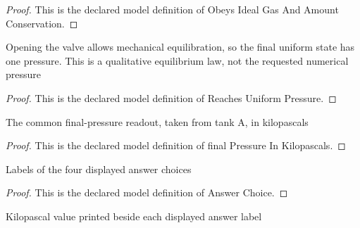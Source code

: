 \begin{proof}
  This is the declared model definition of Obeys Ideal Gas And Amount Conservation.
\end{proof}
\begin{definition}
  \label{def:physics:phyx-mini-0400:phyxminiproblems-problemphyxmini0400-reachesuniformpressure}
  Opening the valve allows mechanical equilibration, so the final uniform state has one pressure. This is a qualitative equilibrium law, not the requested numerical pressure
\end{definition}
\begin{proof}
  This is the declared model definition of Reaches Uniform Pressure.
\end{proof}
\begin{definition}
  \label{def:physics:phyx-mini-0400:phyxminiproblems-problemphyxmini0400-finalpressureinkilopascals}
  The common final-pressure readout, taken from tank A, in kilopascals
\end{definition}
\begin{proof}
  This is the declared model definition of final Pressure In Kilopascals.
\end{proof}
\begin{definition}
  \label{def:physics:phyx-mini-0400:phyxminiproblems-problemphyxmini0400-answerchoice}
  Labels of the four displayed answer choices
\end{definition}
\begin{proof}
  This is the declared model definition of Answer Choice.
\end{proof}
\begin{definition}
  \label{def:physics:phyx-mini-0400:phyxminiproblems-problemphyxmini0400-answerchoice-pressureinkilopascals}
  Kilopascal value printed beside each displayed answer label
\end{definition}
